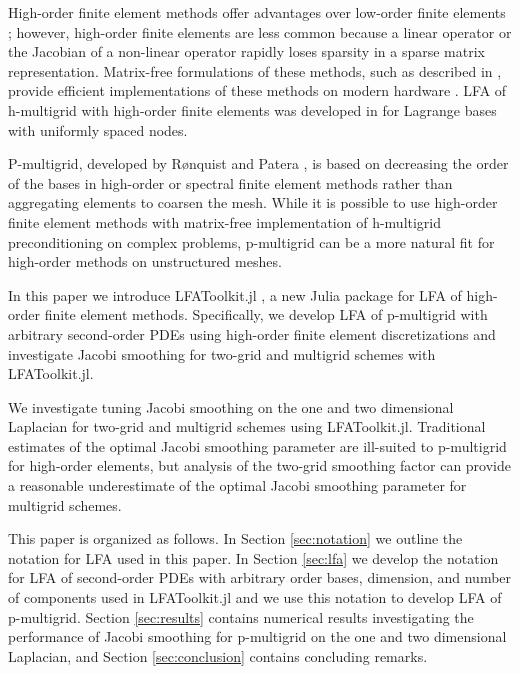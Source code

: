\documentclass[review]{siamart190516}
\begin{document}
High-order finite element methods offer advantages over low-order finite elements \cite{demkowicz1989toward, oden1989toward, rachowicz1989toward}; however, high-order finite elements are less common because a linear operator or the Jacobian of a non-linear operator rapidly loses sparsity in a sparse matrix representation.
Matrix-free formulations of these methods, such as described in \cite{brown2010efficient, knoll2004jacobian}, provide efficient implementations of these methods on modern hardware \cite{libceed-user-manual, fischer2020scalability}.
LFA of h-multigrid with high-order finite elements was developed in \cite{he2020two} for Lagrange bases with uniformly spaced nodes.

P-multigrid, developed by R{\o}nquist and Patera \cite{ronquist1987spectral}, is based on decreasing the order of the bases in high-order or spectral finite element methods rather than aggregating elements to coarsen the mesh. While it is possible \cite{davydov2019matrix} to use high-order finite element methods with matrix-free implementation of h-multigrid preconditioning on complex problems, p-multigrid can be a more natural fit for high-order methods on unstructured meshes.

In this paper we introduce LFAToolkit.jl \cite{thompson2021toolkit}, a new Julia package for LFA of high-order finite element methods.
Specifically, we develop LFA of p-multigrid with arbitrary second-order PDEs using high-order finite element discretizations and investigate Jacobi smoothing for two-grid and multigrid schemes with LFAToolkit.jl.

We investigate tuning Jacobi smoothing on the one and two dimensional Laplacian for two-grid and multigrid schemes using LFAToolkit.jl.
Traditional estimates of the optimal Jacobi smoothing parameter are ill-suited to p-multigrid for high-order elements, but analysis of the two-grid smoothing factor can provide a reasonable underestimate of the optimal Jacobi smoothing parameter for multigrid schemes.

This paper is organized as follows.
In Section \ref{sec:notation} we outline the notation for LFA used in this paper.
In Section \ref{sec:lfa} we develop the notation for LFA of second-order PDEs with arbitrary order bases, dimension, and number of components used in LFAToolkit.jl and we use this notation to develop LFA of p-multigrid.
Section \ref{sec:results} contains numerical results investigating the performance of Jacobi smoothing for p-multigrid on the one and two dimensional Laplacian, and Section \ref{sec:conclusion} contains concluding remarks. 
\end{document}
